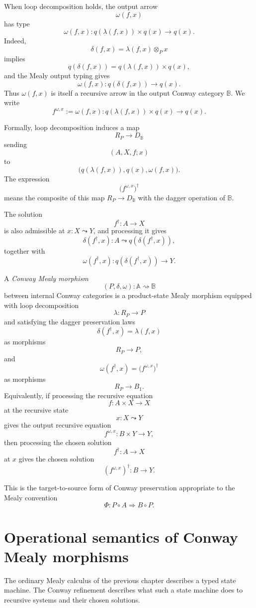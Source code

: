 When loop decomposition holds, the output arrow
\[
\omega(f,x)
\]
has type
\[
\omega(f,x):
q(\lambda(f,x))\times q(x)\to q(x).
\]
Indeed,
\[
\delta(f,x)=\lambda(f,x)\otimes_P x
\]
implies
\[
q(\delta(f,x))
=
q(\lambda(f,x))\times q(x),
\]
and the Mealy output typing gives
\[
\omega(f,x):q(\delta(f,x))\to q(x).
\]
Thus \(\omega(f,x)\) is itself a recursive arrow in the output Conway
category \(\mathbb B\).  We write
\[
f^{\omega,x}
:=
\omega(f,x)
:
q(\lambda(f,x))\times q(x)\to q(x).
\]

Formally, loop decomposition induces a map
\[
R_P\to D_{\mathbb B}
\]
sending
\[
(A,X,f;x)
\]
to
\[
\bigl(q(\lambda(f,x)),q(x),\omega(f,x)\bigr).
\]
The expression
\[
\bigl(f^{\omega,x}\bigr)^\dagger
\]
means the composite of this map \(R_P\to D_{\mathbb B}\) with the dagger
operation of \(\mathbb B\).

The solution
\[
f^\dagger:A\to X
\]
is also admissible at \(x:X\leadsto Y\), and processing it gives
\[
\delta(f^\dagger,x):A\leadsto q(\delta(f^\dagger,x)),
\]
together with
\[
\omega(f^\dagger,x):
q(\delta(f^\dagger,x))\to Y.
\]

\begin{definition}
\label{def:conway-mealy-morphism}
A \emph{Conway Mealy morphism}
\[
(P,\delta,\omega):\mathbb A\rightsquigarrow\mathbb B
\]
between internal Conway categories is a product-state Mealy morphism equipped
with loop decomposition
\[
\lambda:R_P\to P
\]
and satisfying the dagger preservation laws
\[
\delta(f^\dagger,x)=\lambda(f,x)
\]
as morphisms
\[
R_P\to P,
\]
and
\[
\omega(f^\dagger,x)
=
\bigl(f^{\omega,x}\bigr)^\dagger
\]
as morphisms
\[
R_P\to B_1.
\]
Equivalently, if processing the recursive equation
\[
f:A\times X\to X
\]
at the recursive state
\[
x:X\leadsto Y
\]
gives the output recursive equation
\[
f^{\omega,x}:B\times Y\to Y,
\]
then processing the chosen solution
\[
f^\dagger:A\to X
\]
at \(x\) gives the chosen solution
\[
(f^{\omega,x})^\dagger:B\to Y.
\]
\end{definition}

This is the target-to-source form of Conway preservation appropriate to the
Mealy convention
\[
\Phi:P\circ A\Rightarrow B\circ P.
\]

\section{Operational semantics of Conway Mealy morphisms}
\label{sec:operational-semantics-conway-mealy}

The ordinary Mealy calculus of the previous chapter describes a typed state
machine.  The Conway refinement describes what such a state machine does to
recursive systems and their chosen solutions.

